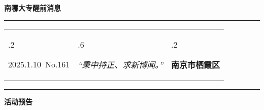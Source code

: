 \documentclass[letterpaper, 12pt]{article}
\begin{document}
\begin{center}
    \Huge\textbf{南哪大专醒前消息}
\end{center}
\vspace{4mm}
\hrule
\renewcommand\tabularxcolumn[1]{m{#1}}
\begin{tabularx}{\textwidth}{>{\hsize.2\hsize}X>{\hsize.6\hsize}X>{\hsize.2\hsize}X}
    \begin{flushleft}
        2025.1.10\, No.161
    \end{flushleft}
    &
    \begin{center}
        \textit{“秉中持正、求新博闻。”}
    \end{center}
    &
    \begin{flushright}
        \textbf{南京市栖霞区}
    \end{flushright}
\end{tabularx}
\vspace{-3.5mm}
\hrule
\vspace{4mm}
\centerline{\huge\textbf{活动预告}}
\end{document}
